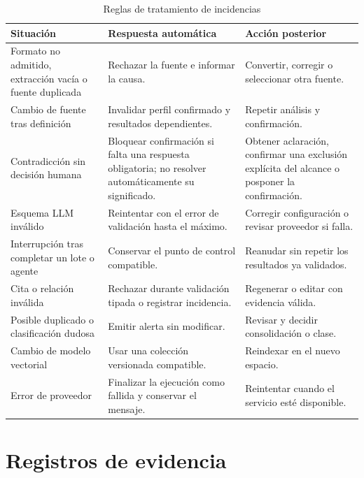\begin{table}[H]
  \centering
  \caption{Reglas de tratamiento de incidencias}
  \label{tab:incidencias-proceso}
  \small
  \begin{tabularx}{\textwidth}{p{4.1cm}YY}
    \toprule
    Situación & Respuesta automática & Acción posterior \\
    \midrule
    Formato no admitido, extracción vacía o fuente duplicada & Rechazar la fuente e informar la causa. & Convertir, corregir o seleccionar otra fuente. \\
    Cambio de fuente tras definición & Invalidar perfil confirmado y resultados dependientes. & Repetir análisis y confirmación. \\
    Contradicción sin decisión humana & Bloquear confirmación si falta una respuesta obligatoria; no resolver automáticamente su significado. & Obtener aclaración, confirmar una exclusión explícita del alcance o posponer la confirmación. \\
    Esquema LLM inválido & Reintentar con el error de validación hasta el máximo. & Corregir configuración o revisar proveedor si falla. \\
    Interrupción tras completar un lote o agente & Conservar el punto de control compatible. & Reanudar sin repetir los resultados ya validados. \\
    Cita o relación inválida & Rechazar durante validación tipada o registrar incidencia. & Regenerar o editar con evidencia válida. \\
    Posible duplicado o clasificación dudosa & Emitir alerta sin modificar. & Revisar y decidir consolidación o clase. \\
    Cambio de modelo vectorial & Usar una colección versionada compatible. & Reindexar en el nuevo espacio. \\
    Error de proveedor & Finalizar la ejecución como fallida y conservar el mensaje. & Reintentar cuando el servicio esté disponible. \\
    \bottomrule
  \end{tabularx}
\end{table}

\section{Registros de evidencia}

